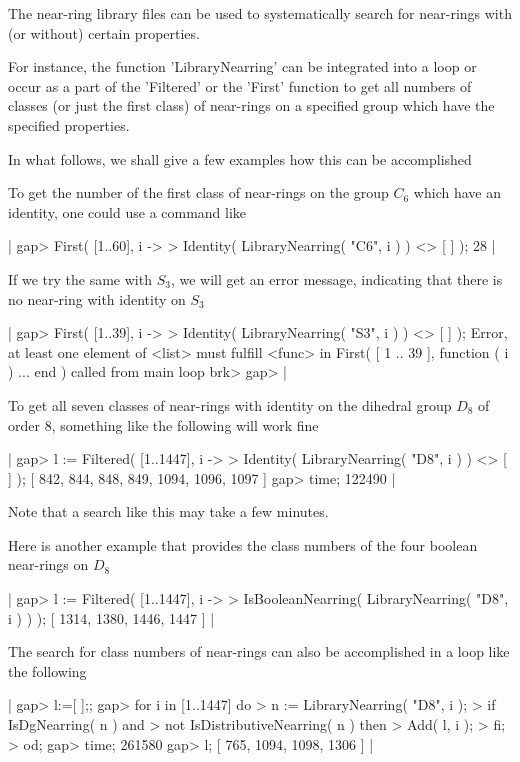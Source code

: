    
The near-ring library files can be used to systematically search for 
near-rings with (or without) certain properties.

For instance, the function 'LibraryNearring' can be integrated
into a loop or occur as a part of the 'Filtered' or the
'First' function to get all numbers of classes (or just the first class) 
of near-rings on a specified group which have the specified properties.  

In what follows, we shall give a few examples how this can be
accomplished\:\ 

To get the number of the first class of near-rings on the
group $C_6$ which have an identity, one could use a command like\:\

|  gap> First( [1..60], i ->                                       
  >           Identity( LibraryNearring( "C6", i ) ) <> [ ] ); 
  28
|

If we try the same with $S_3$, we will get an error message, indicating 
that there is no near-ring with identity on $S_3$\:\

|  gap> First( [1..39], i ->                  
  >           Identity( LibraryNearring( "S3", i ) ) <> [ ] );
  Error, at least one element of <list> must fulfill <func> in
  First( [ 1 .. 39 ], function ( i ) ... end ) called from
  main loop
  brk> 
  gap> 
|

To get all seven classes of near-rings with identity on the dihedral group
$D_8$ of order $8$, something like the following will work fine\:\

|  gap> l := Filtered( [1..1447], i ->                            
  >           Identity( LibraryNearring( "D8", i ) ) <> [ ] );
  [ 842, 844, 848, 849, 1094, 1096, 1097 ]
  gap> time;
  122490
|

Note that a search like this may take a few minutes.

Here is another example that provides the class numbers of the four 
boolean near-rings on $D_8$\:\

|  gap> l := Filtered( [1..1447], i ->                            
  >           IsBooleanNearring( LibraryNearring( "D8", i ) ) );       
  [ 1314, 1380, 1446, 1447 ]
|

The search for class numbers of near-rings can also be accomplished in a 
loop like the following\:\

|  gap> l:=[ ];;
  gap> for i in [1..1447] do
  >      n := LibraryNearring( "D8", i );
  >      if IsDgNearring( n ) and
  >        not IsDistributiveNearring( n ) then
  >          Add( l, i );
  >      fi;
  >    od;
  gap> time;
  261580
  gap> l;
  [ 765, 1094, 1098, 1306 ]
|

